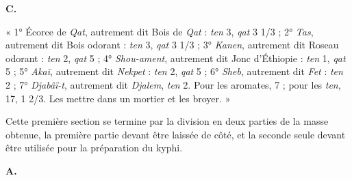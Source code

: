 \documentclass[a4paper, 11pt, oneside, landscape]{article}
\newcommand*\hieroAAAB{}
\newcommand*\hieroAAAH{}
\newcommand*\hieroAAAL{}
\newcommand*\hieroAAAM{}
\newcommand*\hieroAAAR{}
\newcommand*\hieroAABB{}
\newcommand*\hieroAABT{}
\newcommand*\hieroAABV{}
\newcommand*\hieroAACM{}
\newcommand*\hieroAACQ{}
\newcommand*\hieroAADK{}
\newcommand*\hieroAADS{}
\newcommand*\hieroAADT{}
\newcommand*\hieroAAFM{}
\newcommand*\hieroAAFN{}
\newcommand*\hieroAAFO{\raisebox{0.5ex}{}}
\newcommand*\hieroAAFS{}
\newcommand*\hieroAAGA{}
\newcommand*\hieroAAGB{}
\newcommand*\hieroAAGC{}
\newcommand*\hieroAAGD{}
\newcommand*\hieroAAGE{}
\newcommand*\hieroAAGK{}
\newcommand*\hieroAAHD{}
\newcommand*\hieroAAHE{}
\newcommand*\hieroAAHF{}
\newcommand*\hieroAAHG{}
\newcommand*\hieroAAHH{}
\newcommand*\hieroAAHI{}
\newcommand*\hieroAAHJ{}
\newcommand*\hieroAAHK{}
\newcommand*\hieroAAHL{}
\newcommand*\hieroAAHM{}
\newcommand*\hieroAAHN{}
\newcommand*\hieroAAHO{\raisebox{0.6ex}{}}
\newcommand*\hieroAAHP{}
\newcommand*\hieroAAHQ{}
\newcommand*\hieroAAHR{}
\newcommand*\hieroAAHS{}
\newcommand*\hieroAAHT{}
\newcommand*\hieroAAHU{\raisebox{0.7ex}{}}
\newcommand*\hieroAAHV{}
\newcommand*\hieroAAHW{}
\newcommand*\hieroAAHX{}
\newcommand*\hieroAAHY{}
\newcommand*\hieroAAHZ{}
\newcommand*\hieroAAIA{}
\newcommand*\hieroAAIB{\raisebox{1ex}{}}
\newcommand*\hieroAAIC{}
\newcommand*\hieroAAID{}
\newcommand*\hieroAAIE{}
\newcommand*\hieroAAIF{}
\newcommand*\hieroAAIG{}
\newcommand*\hieroAAIH{}
\newcommand*\hieroAAII{}
\newcommand*\hieroAAIJ{}
\newcommand*\hieroAAIK{\raisebox{0.3ex}{}}
\newcommand*\hieroAAIL{}
\newcommand*\hieroAAIM{}
\newcommand*\hieroAAIN{}
\newcommand*\hieroAAIO{}
\newcommand*\hieroAAIP{}
\newcommand*\hieroAAIQ{}
\newcommand*\hieroAAIR{}
\newcommand*\hieroAAIS{}
\newcommand*\hieroAAIT{}
\newcommand*\hieroAAIU{}
\newcommand*\hieroAAIV{}
\begin{document}
\hspace*{10mm}\textbf{C.}\hspace*{5mm} $\hieroAAHD\:\hieroAAHE\:\hieroAAHF\:\hieroAAHG\:\hieroAAGD\:\hieroAAHH\:\hieroAAHI\:\hieroAAHF\:\hieroAAHG\:\hieroAAGD\:\hieroAAFM\:\hieroAAGA\:\hieroAAHJ\:\hieroAAHK$ \hspace*{5mm} $\hieroAAGB\:\hieroAAGC\:\hieroAAGD\:\hieroAAHH\:\hieroAAHL\:\hieroAADK\:\hieroAADK\:\hieroAABV\:\hieroAAFM\:\hieroAAGA\:\hieroAAHJ\:\hieroAAHK$ \hspace*{5mm} $\hieroAAHM\:\hieroAAGD\:\hieroAAHH\:\hieroAAAH\:\hieroAABB\:\hieroAAFS\:\hieroAAGD\:\hieroAADK\:\hieroAADK\:\hieroAAHN\:\hieroAAGA\:\hieroAAHO$ \hspace*{5mm} $\hieroAACM\:\hieroAAFN\:\hieroAAHP\:\hieroAAHH\:\hieroAAHQ\:\hieroAAFO\:\hieroAAHR\:\hieroAAHS\:\hieroAAHT\:\hieroAAHU\:\hieroAAGA\:\hieroAAHO$ \hspace*{5mm} $\hieroAAGE\:\hieroAAAB\:\hieroAAAM\:\hieroAAAM\:\hieroAABV\:\hieroAAHH\:\hieroAAHV\:\hieroAAHW\:\hieroAAHN\:\hieroAAGA\:\hieroAAHO$ \hspace*{5mm} $\hieroAAHX\:\hieroAAHW\:\hieroAAHH\:\hieroAAHY\:\hieroAAFO\:\hieroAAHN$ \hspace*{5mm} $\hieroAAGK\:\hieroAAGD\:\hieroAAHH\:\hieroAAHZ\:\hieroAAIA\:\hieroAAFO\\\:\hieroAAHN\:\hieroAAIB\:\hieroAADS\:\hieroAADT\:\hieroAAAR\:\hieroAAIC\:\hieroAAID\:\hieroAAIE\:\hieroAAIF\:\hieroAAGA\:\hieroAAIG\:\hieroAAAM\:\hieroAAAL\:\hieroAABT\:\hieroAAIH\:\hieroAAII\:\hieroAAIJ\:\hieroAAIK\:\hieroAAAM\:\hieroAAIL\:\hieroAAIM\:\hieroAAIN$

« 1° Écorce de \emph{Qat}, autrement dit Bois de \emph{Qat} : \emph{ten} 3, \emph{qat} 3 1/3 ; 2° \emph{Tas}, autrement dit Bois odorant : \emph{ten} 3, \emph{qat} 3 1/3 ; 3° \emph{Kanen}, autrement dit Roseau odorant : \emph{ten} 2, \emph{qat} 5 ; 4° \emph{Shou-ament}, autrement dit Jonc d'Éthiopie : \emph{ten} 1, \emph{qat} 5 ; 5° \emph{Akaï}, autrement dit \emph{Nekpet} : \emph{ten} 2, \emph{qat} 5 ; 6° \emph{Sheb}, autrement dit \emph{Fet} : \emph{ten} 2 ; 7° \emph{Djabâï-t}, autrement dit \emph{Djalem}, \emph{ten} 2. Pour les aromates, 7 ; pour les \emph{ten}, 17, 1 2/3. Les mettre dans un mortier et les broyer. »

Cette première section se termine par la division en deux parties de la masse obtenue, la première partie devant être laissée de côté, et la seconde seule devant être utilisée pour la préparation du kyphi.

\hspace*{10mm}\textbf{A.}\hspace*{5mm} $\hieroAACQ\:\hieroAAIO\:\hieroAAIP\:\hieroAAIQ\:\hieroAAIR\:\hieroAAIS\:\hieroAAIT\:\hieroAAIU\:\hieroAAGA\:\hieroAAIV$
\end{document}
